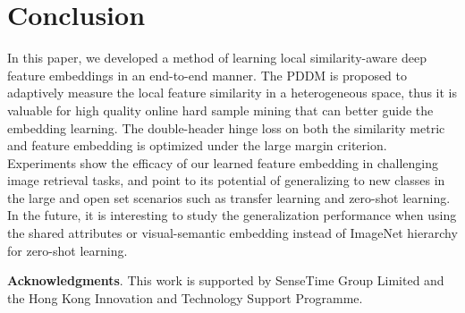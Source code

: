 \documentclass{article}
\begin{document}
\section{Conclusion}
In this paper, we developed a method of learning local similarity-aware deep feature embeddings in an end-to-end manner. The PDDM is proposed to adaptively measure the local feature similarity in a heterogeneous space, thus it is valuable for high quality online hard sample mining that can better guide the embedding learning. The double-header hinge loss on both the similarity metric and feature embedding is optimized under the large margin criterion. Experiments show the efficacy of our learned feature embedding in challenging image retrieval tasks, and point to its potential of generalizing to new classes in the large and open set scenarios such as transfer learning and zero-shot learning. In the future, it is interesting to study the generalization performance when using the shared attributes or visual-semantic embedding instead of ImageNet hierarchy for zero-shot learning.

\noindent \textbf{Acknowledgments}.
This work is supported by SenseTime Group Limited and the Hong Kong Innovation and Technology Support Programme.



{\small


}
\end{document}
